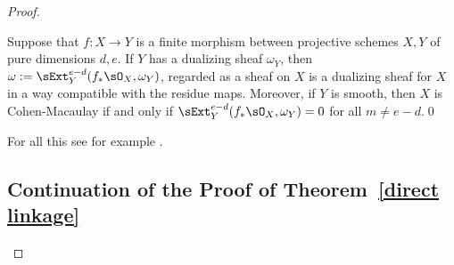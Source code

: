 \begin{proof}
\begin{fact}
\begin{theorem}\label{omega}\label{general adjunction}
Suppose that $f: X\to Y$ is a finite morphism between projective schemes $X,Y$ of pure dimensions $d,e$. If $Y$ has a dualizing sheaf $\omega_Y$,
then $\omega := \sExt_Y^{e-d}(f_*\sO_X,  \omega_Y)$, regarded as a sheaf on $X$ is a dualizing sheaf for $X$ in a way compatible with the residue maps.
Moreover, if $Y$ is smooth, then $X$ is Cohen-Macaulay if and only if $ \sExt_Y^{e-d}(f_*\sO_X,  \omega_Y)= 0$ for all $m\neq e-d$.\qed
\end{theorem}

For all this see for example \cite{AltmanKleiman}.
\end{fact}


\subsection{Continuation of the Proof of Theorem~\ref{direct linkage}}


\end{proof}
